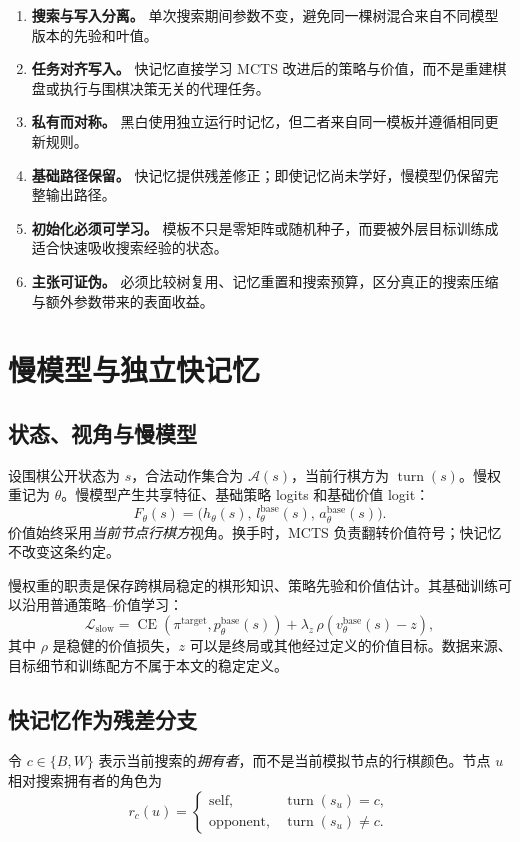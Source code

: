 \documentclass[UTF8,11pt,a4paper]{ctexart}
\newcommand{\slow}{\theta}
\newcommand{\CE}{\operatorname{CE}}
\begin{document}
\begin{enumerate}
  \item \textbf{搜索与写入分离。} 单次搜索期间参数不变，避免同一棵树混合来自不同模型版本的先验和叶值。
  \item \textbf{任务对齐写入。} 快记忆直接学习 MCTS 改进后的策略与价值，而不是重建棋盘或执行与围棋决策无关的代理任务。
  \item \textbf{私有而对称。} 黑白使用独立运行时记忆，但二者来自同一模板并遵循相同更新规则。
  \item \textbf{基础路径保留。} 快记忆提供残差修正；即使记忆尚未学好，慢模型仍保留完整输出路径。
  \item \textbf{初始化必须可学习。} 模板不只是零矩阵或随机种子，而要被外层目标训练成适合快速吸收搜索经验的状态。
  \item \textbf{主张可证伪。} 必须比较树复用、记忆重置和搜索预算，区分真正的搜索压缩与额外参数带来的表面收益。
\end{enumerate}

\section{慢模型与独立快记忆}

\subsection{状态、视角与慢模型}

设围棋公开状态为 $s$，合法动作集合为 $\mathcal A(s)$，当前行棋方为 $\operatorname{turn}(s)$。慢权重记为 $\slow$。慢模型产生共享特征、基础策略 logits 和基础价值 logit：
\[
  F_{\slow}(s)
  =\bigl(h_{\slow}(s),\,l^{\mathrm{base}}_{\slow}(s),\,
          a^{\mathrm{base}}_{\slow}(s)\bigr).
\]
价值始终采用\emph{当前节点行棋方}视角。换手时，MCTS 负责翻转价值符号；快记忆不改变这条约定。

慢权重的职责是保存跨棋局稳定的棋形知识、策略先验和价值估计。其基础训练可以沿用普通策略--价值学习：
\[
  \mathcal L_{\mathrm{slow}}
  =\CE\!\left(\pi^{\mathrm{target}},p^{\mathrm{base}}_{\slow}(s)\right)
   +\lambda_z\,\rho\!\left(v^{\mathrm{base}}_{\slow}(s)-z\right),
\]
其中 $\rho$ 是稳健的价值损失，$z$ 可以是终局或其他经过定义的价值目标。数据来源、目标细节和训练配方不属于本文的稳定定义。

\subsection{快记忆作为残差分支}

令 $c\in\{B,W\}$ 表示当前搜索的\emph{拥有者}，而不是当前模拟节点的行棋颜色。节点 $u$ 相对搜索拥有者的角色为
\[
 r_c(u)=
 \begin{cases}
   \mathrm{self}, & \operatorname{turn}(s_u)=c,\\
   \mathrm{opponent}, & \operatorname{turn}(s_u)\ne c.
 \end{cases}
\]
\end{document}
